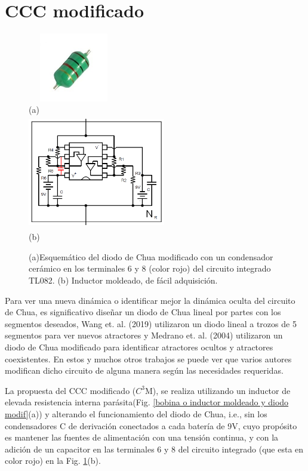 \documentclass{rbf}
\begin{document}
\section{CCC modificado\label{sec:Circuito de Chua modificado}}

\begin{figure}[h]
    \centering
        \hspace{0cm}\includegraphics[width=4cm,height=3cm]{InductorMoldeado.jpg}\\
         (a)\\
        \hspace{0cm}\includegraphics[width=6cm,height=5cm]{diodo modificado.png}\\
         (b)\\
    \caption{ (a)Esquemático del diodo de Chua modificado con un condensador cerámico en los terminales 6 y 8 (color rojo) del circuito integrado TL082. (b) Inductor moldeado, de fácil adquisición.}
    \label{bobina o inductor moldeado y diodo modificado}
\end{figure}

Para ver una nueva dinámica o identificar mejor la dinámica oculta del circuito de Chua, es significativo diseñar un diodo de Chua lineal por partes con los segmentos deseados, Wang et. al. (2019) utilizaron un diodo lineal a trozos de 5 segmentos para ver nuevos atractores y Medrano et. al. (2004) utilizaron un diodo de Chua modificado para identificar atractores ocultos y atractores coexistentes. En estos y muchos otros trabajos se puede ver que varios autores modifican dicho circuito de alguna manera según las necesidades requeridas.

La propuesta del CCC modificado ($C^3$M), se realiza utilizando un inductor de elevada resistencia interna parásita(Fig. \ref{bobina o inductor moldeado y diodo modif}(a)) y alterando el funcionamiento del diodo de Chua, i.e., sin los condensadores C de derivación conectados a cada batería de 9V, cuyo propósito es mantener las fuentes de alimentación con una tensión continua, y con la adición de un capacitor en las terminales 6 y 8 del circuito integrado (que esta en color rojo) en la Fig. \ref{bobina o inductor moldeado y diodo modificado}(b). 
\end{document}

